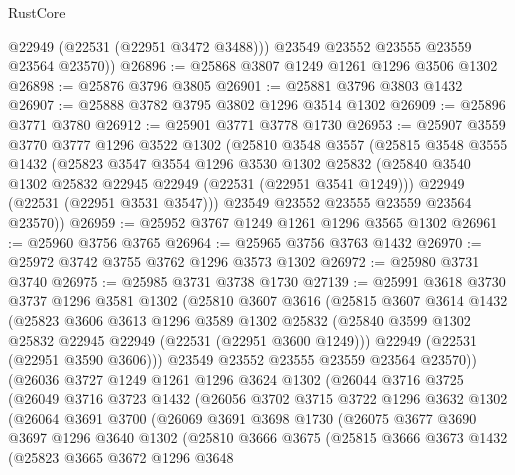 \begin{lexlean}{RustCore}
\begin{coremodule}
          @22949
          (@22531 (@22951 @3472 @3488)))
        @23549
        @23552
        @23555
        @23559
        @23564
        @23570))
@26896 := @25868 @3807 @1249 @1261 @1296 @3506 @1302
@26898 := @25876 @3796 @3805
@26901 := @25881 @3796 @3803 @1432
@26907 := @25888 @3782 @3795 @3802 @1296 @3514 @1302
@26909 := @25896 @3771 @3780
@26912 := @25901 @3771 @3778 @1730
@26953 := @25907
    @3559
    @3770
    @3777
    @1296
    @3522
    @1302
    (@25810
      @3548
      @3557
      (@25815
        @3548
        @3555
        @1432
        (@25823
          @3547
          @3554
          @1296
          @3530
          @1302
          @25832
          (@25840 @3540 @1302 @25832 @22945 @22949 (@22531 (@22951 @3541 @1249)))
          @22949
          (@22531 (@22951 @3531 @3547)))
        @23549
        @23552
        @23555
        @23559
        @23564
        @23570))
@26959 := @25952 @3767 @1249 @1261 @1296 @3565 @1302
@26961 := @25960 @3756 @3765
@26964 := @25965 @3756 @3763 @1432
@26970 := @25972 @3742 @3755 @3762 @1296 @3573 @1302
@26972 := @25980 @3731 @3740
@26975 := @25985 @3731 @3738 @1730
@27139 := @25991
    @3618
    @3730
    @3737
    @1296
    @3581
    @1302
    (@25810
      @3607
      @3616
      (@25815
        @3607
        @3614
        @1432
        (@25823
          @3606
          @3613
          @1296
          @3589
          @1302
          @25832
          (@25840 @3599 @1302 @25832 @22945 @22949 (@22531 (@22951 @3600 @1249)))
          @22949
          (@22531 (@22951 @3590 @3606)))
        @23549
        @23552
        @23555
        @23559
        @23564
        @23570))
    (@26036
      @3727
      @1249
      @1261
      @1296
      @3624
      @1302
      (@26044
        @3716
        @3725
        (@26049
          @3716
          @3723
          @1432
          (@26056
            @3702
            @3715
            @3722
            @1296
            @3632
            @1302
            (@26064
              @3691
              @3700
              (@26069
                @3691
                @3698
                @1730
                (@26075
                  @3677
                  @3690
                  @3697
                  @1296
                  @3640
                  @1302
                  (@25810
                    @3666
                    @3675
                    (@25815
                      @3666
                      @3673
                      @1432
                      (@25823
                        @3665
                        @3672
                        @1296
                        @3648

\end{coremodule}
\end{lexlean}

